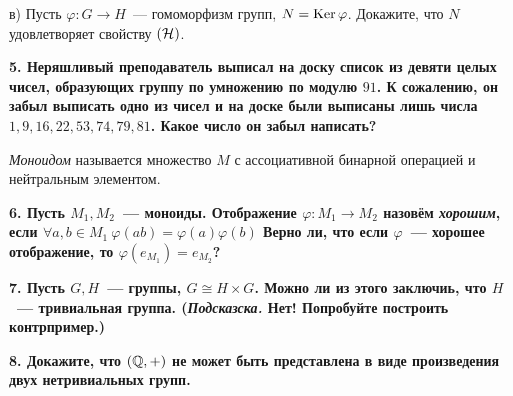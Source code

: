 \documentclass[12pt]{article}
\begin{document}
	в) Пусть $\varphi \colon G \to H$~--- гомоморфизм групп, $N = \operatorname{Ker}{\varphi}$. Докажите, что $N$ удовлетворяет свойству $(\mathcal{H})$.

	\bf{5.} Неряшливый преподаватель выписал на доску список из девяти целых чисел, образующих группу по умножению по модулю $91$. К сожалению, он забыл выписать одно из чисел и на доске были выписаны лишь числа $1, 9, 16, 22, 53, 74, 79, 81$. Какое число он забыл написать? 

	\begin{definition} 
		\emph{Моноидом} называется множество $M$ с ассоциативной бинарной операцией и нейтральным элементом.   
	\end{definition}

	\bf{6.} Пусть $M_1, M_2$~--- моноиды. Отображение $\varphi \colon M_1 \to M_2$ назовём \emph{хорошим}, если $\forall a, b \in M_1 \ \varphi(ab) = \varphi(a) \varphi(b)$
	  Верно ли, что если $\varphi$~--- хорошее отображение, то $\varphi(e_{M_1}) = e_{M_2}$?

	 \bf{7.}  Пусть $G, H$~--- группы,  $G \cong H \times G$. Можно ли из этого заключиь, что $H$~--- тривиальная группа. (\emph{Подсказска.} Нет! Попробуйте построить контрпример.)

	 \bf{8.} Докажите, что $(\mathbb{Q}, +)$ не может быть представлена в виде произведения двух нетривиальных групп.




	
\end{document}
